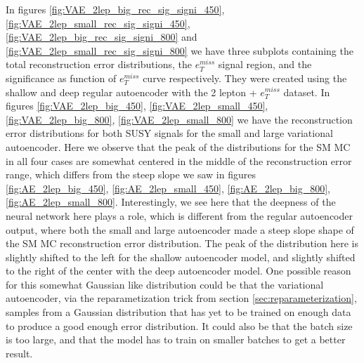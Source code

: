 In figures \ref{fig:VAE_2lep_big_rec_sig_signi_450}, \ref{fig:VAE_2lep_small_rec_sig_signi_450}, 
\ref{fig:VAE_2lep_big_rec_sig_signi_800} and \ref{fig:VAE_2lep_small_rec_sig_signi_800} we have three 
subplots containing the total reconstruction error distributions, the $e_T^{miss}$ signal region, 
and the significance as function of $e_T^{miss}$ curve respectively. They were created using 
the shallow and deep regular autoencoder with the 2 lepton + $e_T^{miss}$ dataset.
In figures \ref{fig:VAE_2lep_big_450}, \ref{fig:VAE_2lep_small_450}, \ref{fig:VAE_2lep_big_800}, 
\ref{fig:VAE_2lep_small_800} we have the reconstruction error distributions 
for both SUSY signals for the small and large variational autoencoder. Here we observe that the 
peak of the distributions for the SM MC in all four cases are somewhat centered in the middle 
of the reconstruction error range, which differs from the steep slope we saw in figures 
\ref{fig:AE_2lep_big_450}, \ref{fig:AE_2lep_small_450}, \ref{fig:AE_2lep_big_800}, 
\ref{fig:AE_2lep_small_800}. Interestingly, we see here that the deepness of the neural 
network here plays a role, which is different from the regular autoencoder output, where both 
the small and large autoencoder made a steep slope shape of the SM MC reconstruction error 
distribution. The peak of the distribution here is slightly shifted to the left for the shallow 
autoencoder model, and slightly shifted to the right of the center with the deep autoencoder 
model. One possible reason for this somewhat Gaussian like distribution could be that the 
variational autoencoder, via the reparametization trick from section \ref{sec:reparameterization}, 
samples from a Gaussian distribution that has yet to be trained on enough data to produce a 
good enough error distribution. It could also be that the batch size is too large, and that 
the model has to train on smaller batches to get a better result. \par 

